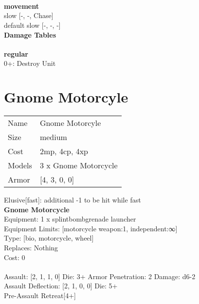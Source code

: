 \ \\
 
\ \\



\ \\ {\bf movement } \\
slow [-, -, Chase] \\
default slow [-, -, -] \\


{\bf Damage Tables} \\
\ \\ {\bf regular } \\
0+: Destroy Unit \\










\pagebreak\pagebreak

\section{ Gnome Motorcyle }

\begin{tabular}{ll}
  Name & Gnome Motorcyle \\
  Size & medium\\
  Cost & 2mp, 4cp, 4xp\\
  Models & 3 x Gnome Motorcycle\\
  Armor & [4, 3, 0, 0]\\
\end{tabular}

\noindent Elusive[fast]: additional -1 to be hit while fast\\ 


{\bf Gnome Motorcycle } \\
Equipment: 1 x splintbombgrenade launcher \\
Equipment Limits: [motorcycle weapon:1, independent:∞] \\
Type: [bio, motorcycle, wheel] \\
Replaces: Nothing \\
Cost: 0\\
\ \\
Assault: [2, 1, 1, 0] Die: 3+ Armor Penetration: 2 Damage: d6-2 \\
Assault Deflection: [2, 1, 0, 0] Die: 5+\\
\indent Pre-Assault Retreat[4+]\\ 
 
